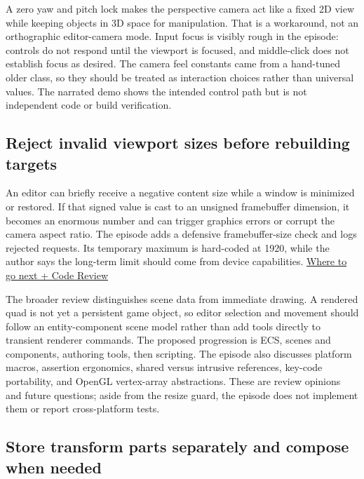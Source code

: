 A zero yaw and pitch lock makes the perspective camera act like a fixed 2D view while keeping objects in 3D space for manipulation. That is a workaround, not an orthographic editor-camera mode. Input focus is visibly rough in the episode: controls do not respond until the viewport is focused, and middle-click does not establish focus as desired. The camera feel constants came from a hand-tuned older class, so they should be treated as interaction choices rather than universal values. The narrated demo shows the intended control path but is not independent code or build verification.

\subsection{Reject invalid viewport sizes before rebuilding targets}\label{06-engine-ii-ch032-reject-invalid-viewport-sizes-before-rebuilding-targets}

An editor can briefly receive a negative content size while a window is minimized or restored. If that signed value is cast to an unsigned framebuffer dimension, it becomes an enormous number and can trigger graphics errors or corrupt the camera aspect ratio. The episode adds a defensive framebuffer-size check and logs rejected requests. Its temporary maximum is hard-coded at 1920, while the author says the long-term limit should come from device capabilities. \href{https://www.youtube.com/watch?v=ZVy81M-IST0}{Where to go next + Code Review}

The broader review distinguishes scene data from immediate drawing. A rendered quad is not yet a persistent game object, so editor selection and movement should follow an entity-component scene model rather than add tools directly to transient renderer commands. The proposed progression is ECS, scenes and components, authoring tools, then scripting. The episode also discusses platform macros, assertion ergonomics, shared versus intrusive references, key-code portability, and OpenGL vertex-array abstractions. These are review opinions and future questions; aside from the resize guard, the episode does not implement them or report cross-platform tests.

\subsection{Store transform parts separately and compose when needed}\label{06-engine-ii-ch032-store-transform-parts-separately-and-compose-when-needed}

